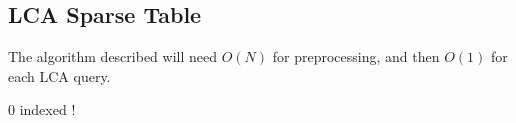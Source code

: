 \subsection{LCA Sparse Table}

The algorithm described will need $O(N)$ for preprocessing, and then $O(1)$ for each LCA query.

{\color{red} 0 indexed !}
